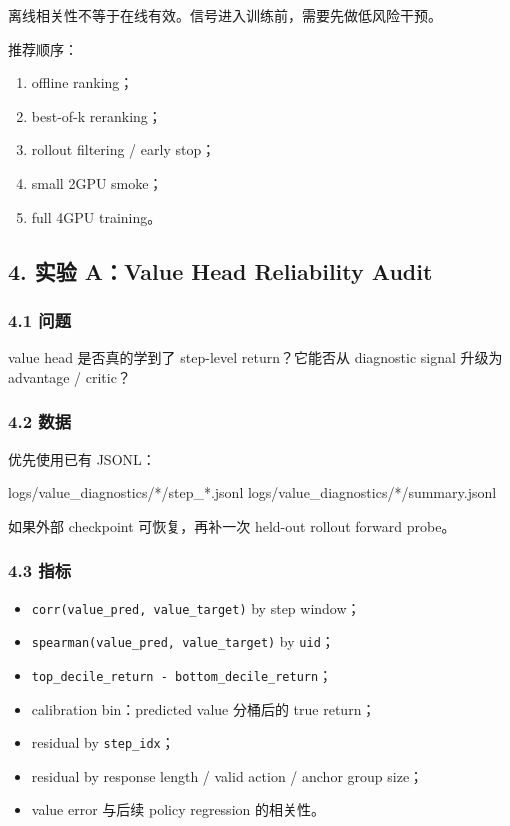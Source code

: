 \documentclass[
  10pt,
]{ctexart}
\newenvironment{Shaded}{}{}
\newcommand{\NormalTok}[1]{#1}
\providecommand{\tightlist}{%
  \setlength{\itemsep}{0pt}\setlength{\parskip}{0pt}}
\begin{document}
离线相关性不等于在线有效。信号进入训练前，需要先做低风险干预。

推荐顺序：

\begin{enumerate}
\def\labelenumi{\arabic{enumi}.}
\tightlist
\item
  offline ranking；
\item
  best-of-k reranking；
\item
  rollout filtering / early stop；
\item
  small 2GPU smoke；
\item
  full 4GPU training。
\end{enumerate}

\subsection{4. 实验 A：Value Head Reliability
Audit}\label{ux5b9eux9a8c-avalue-head-reliability-audit}

\subsubsection{4.1 问题}\label{ux95eeux9898-1}

value head 是否真的学到了 step-level return？它能否从 diagnostic signal
升级为 advantage / critic？

\subsubsection{4.2 数据}\label{ux6570ux636e}

优先使用已有 JSONL：

\begin{Shaded}
\begin{Highlighting}[]
\NormalTok{logs/value\_diagnostics/*/step\_*.jsonl}
\NormalTok{logs/value\_diagnostics/*/summary.jsonl}
\end{Highlighting}
\end{Shaded}

如果外部 checkpoint 可恢复，再补一次 held-out rollout forward probe。

\subsubsection{4.3 指标}\label{ux6307ux6807}

\begin{itemize}
\tightlist
\item
  \texttt{corr(value\_pred,\ value\_target)} by step window；
\item
  \texttt{spearman(value\_pred,\ value\_target)} by \texttt{uid}；
\item
  \texttt{top\_decile\_return\ -\ bottom\_decile\_return}；
\item
  calibration bin：predicted value 分桶后的 true return；
\item
  residual by \texttt{step\_idx}；
\item
  residual by response length / valid action / anchor group size；
\item
  value error 与后续 policy regression 的相关性。
\end{itemize}
\end{document}
